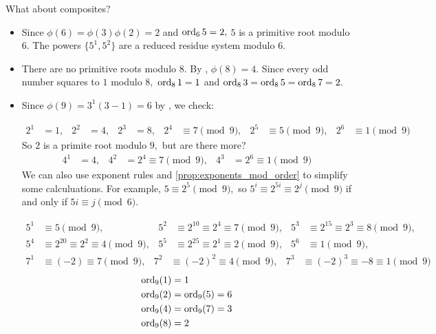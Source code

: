 \documentclass{ximera}
\begin{document}
What about composites?
\begin{example}
    \begin{itemize}
        \item Since $\phi(6)=\phi(3)\phi(2)=2$ and $\operatorname{ord}_6 5=2,$ $5$ is a primitive root modulo $6.$ The powers $\{5^1, 5^2\}$ are a reduced residue system modulo $6.$
        \item There are no primitive roots modulo $8.$ By , $\phi(8)=4.$ Since every odd number squares to $1$ modulo $8,$ $\operatorname{ord}_8 1=1$ and $\operatorname{ord}_8 3=\operatorname{ord}_8 5=\operatorname{ord}_8 7=2.$ 
        \item Since $\phi(9)=3^1(3-1)=6$ by , we check:

        \begin{align*}
            2^1&=1, &2^2&=4, &2^3&=8, &2^4&\equiv7\pmod{9}, &2^5&\equiv 5\pmod{9},&2^6&\equiv 1\pmod{9}
        \end{align*}
        So $2$ is a primite root modulo $9,$ but are there more?
        \begin{align*}
            4^1&=4, &4^2&=2^4\equiv 7\pmod{9}, &4^3&=2^6\equiv1\pmod{9}
        \end{align*}
        We can also use exponent rules and \cref{prop:exponents_mod_order} to simplify some calculuations. For example, $5\equiv 2^5\pmod{9},$ so $5^i\equiv 2^{5i}\equiv 2^j\pmod{9}$ if and only if $5i\equiv j\pmod{6}.$

        \begin{align*}
            5^1&\equiv 5\pmod{9}, 
            &5^2&\equiv 2^{10}\equiv 2^4\equiv 7\pmod{9},
            &5^3&\equiv 2^{15}\equiv 2^3\equiv 8\pmod{9}, \\
            5^4&\equiv 2^{20}\equiv 2^2\equiv 4\pmod{9}, 
            &5^5&\equiv 2^{25}\equiv 2^1\equiv 2\pmod{9},
            &5^6&\equiv 1\pmod{9},
        \end{align*}
        \begin{align*}
            7^1&\equiv (-2)\equiv 7\pmod{9}, 
            &7^2&\equiv (-2)^2\equiv 4\pmod{9},
            &7^3&\equiv (-2)^{3}\equiv -8 \equiv 1\pmod{9}
        \end{align*}
        \begin{align*}
            \operatorname{ord}_9(1)&=1\\
            \operatorname{ord}_9(2)&=\operatorname{ord}_9(5)=6\\
            \operatorname{ord}_9(4)&=\operatorname{ord}_9(7)=3\\
            \operatorname{ord}_9 (8)&=2
        \end{align*}
    \end{itemize}
\end{example}
\end{document}
